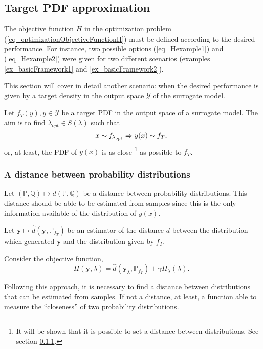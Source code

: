\subsection{Target PDF approximation} \label{sec_targetPDFapproximation}

The objective function $H$ in the optimization problem (\ref{eq_optimizationObjectiveFunctionH}) must be defined according to the desired performance. For instance, two possible options (\ref{eq_Hexample1}) and (\ref{eq_Hexample2}) were given for two different scenarios (examples \ref{ex_basicFramework1} and \ref{ex_basicFramework2}).

This section will cover in detail another scenario: when the desired performance is given by a target density in the output space $\mathcal{Y}$ of the surrogate model.

Let $f_T(y), y \in \mathcal{Y}$ be a target PDF in the output space of a surrogate model. The aim is to find $\lambda_{opt} \in S(\lambda)$ such that
$$
  x \sim f_{\lambda_{\textup{opt}}} \Rightarrow y(x) \sim f_T,
$$ 
or, at least, the PDF of $y(x)$ is as close 
\footnote{It will be shown that it is possible to set a distance between distributions. See section \ref{sec_distanceDistributions}.}
as possible to $f_T$.%

\subsubsection{A distance between probability distributions} \label{sec_distanceDistributions}

Let $(\mathbb{P},\mathbb{Q}) \mapsto d(\mathbb{P},\mathbb{Q})$ be a distance between probability distributions.
This distance should be able to be estimated from samples since this is the only information available of the distribution of $y(x)$.

Let $\pmb{y} \mapsto \widehat{d}(\pmb{y},\mathbb{P}_{f_T})$ be an estimator of the distance $d$ between the distribution which generated $\pmb{y}$ and the distribution given by $f_T$.

Consider the objective function,
$$
  H(\pmb{y},\lambda) = \widehat{d}(\pmb{y}_{\lambda},\mathbb{P}_{f_T}) + \gamma H_{\lambda}(\lambda).
$$ 

Following this approach, it is necessary to find a distance between distributions that can be estimated from samples. If not a distance, at least, a function able to measure the ``closeness'' of two probability distributions.

